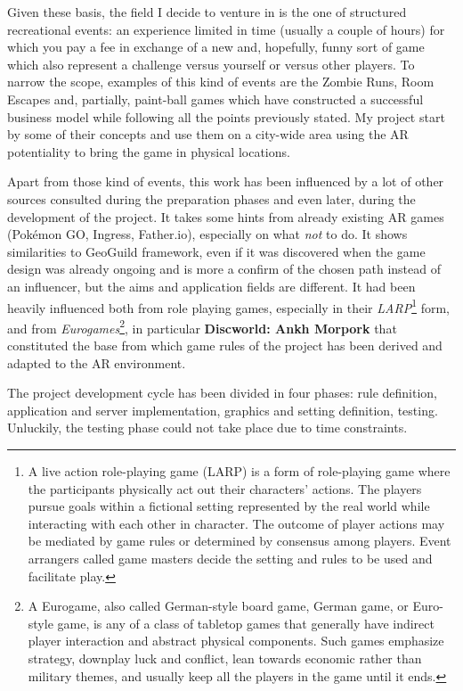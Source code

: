 	Given these basis, the field I decide to venture in is the one of structured recreational events: an experience limited in time (usually a couple of hours) for which you pay a fee in exchange of a new and, hopefully, funny sort of game which also represent a challenge versus yourself or versus other players.
	To narrow the scope, examples of this kind of events are the Zombie Runs, Room Escapes and, partially, paint-ball games which have constructed a successful business model while following all the points previously stated.
	My project start by some of their concepts and use them on a city-wide area using the AR potentiality to bring the game in physical locations.
	
	Apart from those kind of events, this work has been influenced by a lot of other sources consulted during the preparation phases and even later, during the development of the project.
	It takes some hints from already existing AR games (Pokémon GO, Ingress, Father.io), especially on what \emph{not} to do.
	It shows similarities to GeoGuild\cite{ionescu:geoguild} framework, even if it was discovered when the game design was already ongoing and is more a confirm of the chosen path instead of an influencer, but the aims and application fields are different.
	It had been heavily influenced both from role playing games, especially in their \emph{LARP}\footnote{A live action role-playing game (LARP) is a form of role-playing game where the participants physically act out their characters' actions. The players pursue goals within a fictional setting represented by the real world while interacting with each other in character. The outcome of player actions may be mediated by game rules or determined by consensus among players. Event arrangers called game masters decide the setting and rules to be used and facilitate play.\cite{wiki:larp}} form, and from \emph{Eurogames}\footnote{A Eurogame, also called German-style board game, German game, or Euro-style game, is any of a class of tabletop games that generally have indirect player interaction and abstract physical components. Such games emphasize strategy, downplay luck and conflict, lean towards economic rather than military themes, and usually keep all the players in the game until it ends.\cite{wiki:eurogame}}, in particular \textbf{Discworld: Ankh Morpork} that constituted the base from which game rules of the project has been derived and adapted to the AR environment.
	
	The project development cycle has been divided in four phases: rule definition, application and server implementation, graphics and setting definition, testing.
	Unluckily, the testing phase could not take place due to time constraints.